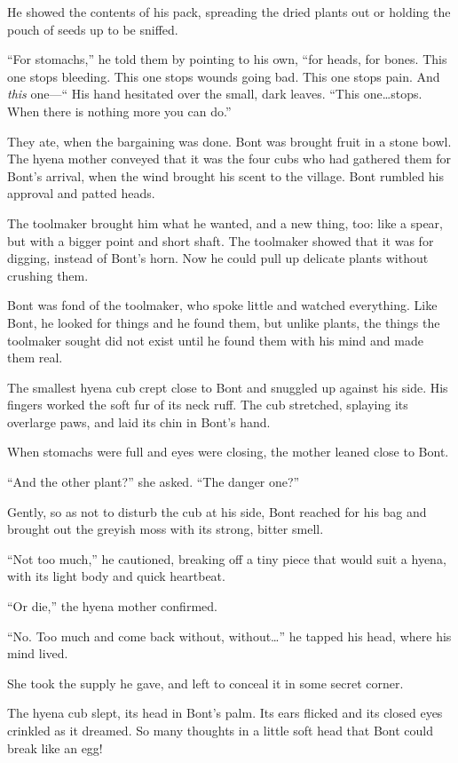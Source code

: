 He showed the contents of his pack, spreading the dried plants out or holding the pouch of seeds up to be sniffed.

``For stomachs,'' he told them by pointing to his own, ``for heads, for bones. This one stops bleeding. This one stops wounds going bad. This one stops pain. And \emph{this} one---`` His hand hesitated over the small, dark leaves. ``This one\ldots stops. When there is nothing more you can do.''

They ate, when the bargaining was done. Bont was brought fruit in a stone bowl. The hyena mother conveyed that it was the four cubs who had gathered them for Bont's arrival, when the wind brought his scent to the village. Bont rumbled his approval and patted heads.

The toolmaker brought him what he wanted, and a new thing, too: like a spear, but with a bigger point and short shaft. The toolmaker showed that it was for digging, instead of Bont's horn. Now he could pull up delicate plants without crushing them.

Bont was fond of the toolmaker, who spoke little and watched everything. Like Bont, he looked for things and he found them, but unlike plants, the things the toolmaker sought did not exist until he found them with his mind and made them real.

The smallest hyena cub crept close to Bont and snuggled up against his side. His fingers worked the soft fur of its neck ruff. The cub stretched, splaying its overlarge paws, and laid its chin in Bont's hand.

When stomachs were full and eyes were closing, the mother leaned close to Bont.

``And the other plant?'' she asked. ``The danger one?''

Gently, so as not to disturb the cub at his side, Bont reached for his bag and brought out the greyish moss with its strong, bitter smell.

``Not too much,'' he cautioned, breaking off a tiny piece that would suit a hyena, with its light body and quick heartbeat.

``Or die,'' the hyena mother confirmed.

``No. Too much and come back without, without\ldots'' he tapped his head, where his mind lived.

She took the supply he gave, and left to conceal it in some secret corner.

The hyena cub slept, its head in Bont's palm. Its ears flicked and its closed eyes crinkled as it dreamed. So many thoughts in a little soft head that Bont could break like an egg!

